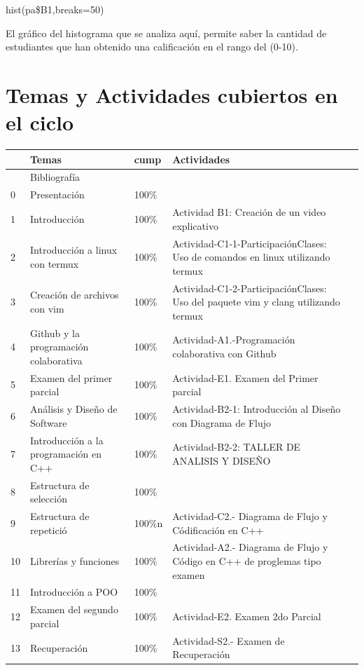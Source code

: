 \documentclass[a4pa<per,12pt,spanish]{article}
\begin{document}
hist(pa\$B1,breaks=50)


\vspace{0.5cm}
El gráfico del histograma que se analiza aquí,  permite saber la cantidad de estudiantes que han obtenido una calificación en el rango del (0-10). 

\section{Temas y Actividades cubiertos en el ciclo}
\label{sec:actividadades}


\begin{tabular}[H]{lp{5cm}p{2cm}p{7cm}l}
  \hline
   &Temas&cump & Actividades & \\ \hline \hline
   & Bibliografía & & \\
  0 & Presentación&100\% & & \\
  1 & Introducción&100\% & Actividad B1: Creación de un video  explicativo  & \\
  2 & Introducción a linux con termux&100\% &Actividad-C1-1-ParticipaciónClases: Uso de comandos en  linux utilizando termux & \\
  3 & Creación de archivos con vim &100\%& Actividad-C1-2-ParticipaciónClases: Uso del paquete vim y clang utilizando termux & \\
  4 & Github y la programación colaborativa&100\% &Actividad-A1.-Programación colaborativa con Github & \\
  5 & Examen del primer parcial&100\% &Actividad-E1. Examen del Primer parcial  & \\
  6 & Análisis y Diseño de Software&100\% &Actividad-B2-1: Introducción al Diseño con Diagrama de Flujo & \\
  7 & Introducción  a la programación en C++&100\% &Actividad-B2-2: TALLER DE ANALISIS Y DISEÑO & \\
  8 & Estructura de selección&100\% & & \\
  9 & Estructura de repetició&100\%n &Actividad-C2.- Diagrama de Flujo y Códificación en C++ & \\
  10 & Librerías y funciones&100\% &Actividad-A2.- Diagrama de Flujo y Código en C++ de proglemas tipo examen  & \\
  11 & Introducción a POO&100\% & & \\
  12 & Examen del segundo parcial&100\% &Actividad-E2. Examen 2do Parcial & \\
  13 & Recuperación&100\%&Actividad-S2.- Examen de Recuperación   &  \\ \hline \hline
  
\end{tabular}
\end{document}
